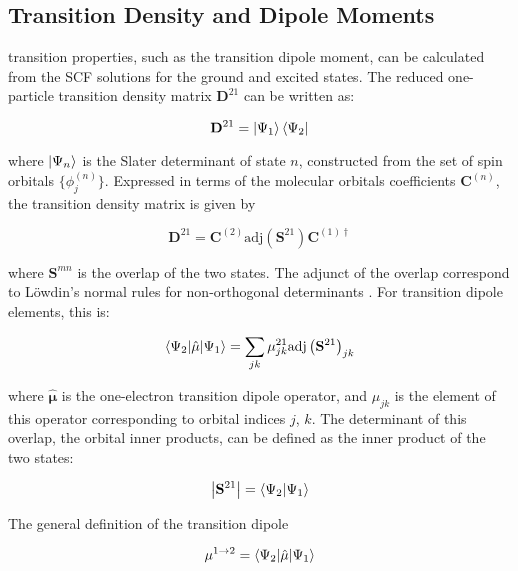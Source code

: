 \subsection{Transition Density and Dipole Moments}
\label{subsec:dscf_transition_density}
\dscf transition properties, such as the transition dipole moment, can be calculated from
the SCF solutions for the ground and excited states. The reduced one-particle transition
density matrix $\mathbf{D}^{21}$ can be written as:

\begin{equation}
\mathbf{D}^{21} = \ket{\Psi_1} \bra{\Psi_2}
\end{equation}

where $\ket{\Psi_n}$ is the Slater determinant of state $n$, constructed from the
set of spin orbitals $\{ \phi_{j}^{\left(n\right)} \} $. Expressed 
in terms of the molecular orbitals coefficients $\mathbf{C}^{\left(n\right)}$, the
transition density matrix is given by

\begin{equation}
\mathbf{D}^{21} = \mathbf{C}^{\left(2\right)} \text{adj}\left(\mathbf{S}^{21}\right) \mathbf{C}^{\left(1\right) \dagger}
\end{equation}

where $\mathbf{S}^{mn}$ is the overlap of the two states. The adjunct of the overlap
correspond to L{\"o}wdin's normal rules for non-orthogonal determinants \cite{Lowdin1955}.
For transition dipole elements, this is:

\begin{equation}
\braket{\Psi_2|\hat{\mathbf{\mu}}|\Psi_1} = \sum_{jk} \mathbf{\mu}_{jk}^{21} \text{adj} \left( \mathbf{S}^{21}\right)_{jk}
\end{equation}

where $\hat{\mathbf{\mu}}$ is the one-electron transition dipole operator, and
$\mu_{jk}$ is the element of this operator corresponding to orbital indices $j$, $k$.
The determinant of this overlap, the orbital inner products, can be defined as the
inner product of the two states:

\begin{equation}
\left\lvert {\mathbf{S}^{21}} \right\rvert = \braket{\Psi_2|\Psi_1}
\end{equation}

The general definition of the transition dipole

\begin{equation}
\mathbf{\mu}^{1\rightarrow2} = \braket{\Psi_2|\hat{\mathbf{\mu}}|\Psi_1}
\end{equation}

